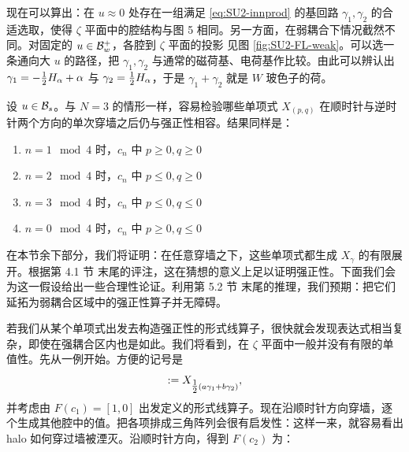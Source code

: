 现在可以算出：在 $u \approx 0$ 处存在一组满足 \eqref{eq:SU2-innprod} 的基回路 $\gamma_1, \gamma_2$ 的合适选取，使得 $\zeta$ 平面中的腔结构与图 5%
相同。另一方面，在弱耦合下情况截然不同。对固定的 $u \in \mathcal{B}_w^+$，各腔到 $\zeta$ 平面的投影
见图 \ref{fig:SU2-FL-weak}。可以选一条通向大 $u$ 的路径，把 $\gamma_1, \gamma_2$
与通常的磁荷基、电荷基作比较。由此可以辨认出
$\gamma_1 = -\tfrac{1}{2} H_\alpha +\alpha$ 与 $\gamma_2 =\tfrac{1}{2} H_\alpha$，于是 $\gamma_1+\gamma_2$ 就是
$W$ 玻色子的荷。

设 $u \in \mathcal{B}_s$。与 $N=3$ 的情形一样，容易检验哪些单项式 $X_{(p,q)}$ 在顺时针与逆时针两个方向的单次穿墙之后仍与强正性相容。结果同样是：

\begin{enumerate}

\item $n=1\mod 4$ 时，$c_n$ 中 $p\geq 0, q\geq 0$

\item $n=2\mod 4$ 时，$c_n$ 中 $p\leq 0, q\geq 0$

\item $n=3\mod 4$ 时，$c_n$ 中 $p\leq 0, q\leq 0$

\item $n=0\mod 4$ 时，$c_n$ 中 $p\geq 0, q\leq 0$

\end{enumerate}

在本节余下部分，我们将证明：在任意穿墙之下，这些单项式都生成 $X_{\gamma}$ 的有限展开。根据第 4.1 节%
末尾的评注，这在猜想的意义上足以证明强正性。下面我们会为这一假设给出一些合理性论证。利用第 5.2 节%
末尾的推理，我们预期：把它们延拓为弱耦合区域中的强正性算子并无障碍。

若我们从某个单项式出发去构造强正性的形式线算子，很快就会发现表达式相当复杂，即使在强耦合区内也是如此。我们将看到，在 $\zeta$ 平面中一般并没有有限的单值性。先从一例开始。方便的记号是
%
\begin{equation}
[a,b]:= X_{\half(a \gamma_1 + b\gamma_2)},
\end{equation}
%
并考虑由 $F(c_1)=[1,0]$ 出发定义的形式线算子。现在沿顺时针方向穿墙，逐个生成其他腔中的值。把各项排成三角阵列会很有启发性：这样一来，就容易看出 halo 如何穿过墙被湮灭。沿顺时针方向，得到 $F(c_2)$ 为：

